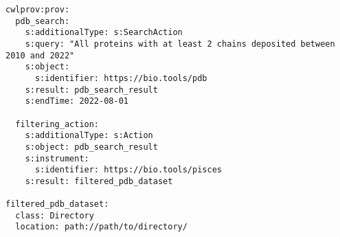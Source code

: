 \begin{verbatim}
cwlprov:prov:
  pdb_search:
    s:additionalType: s:SearchAction
    s:query: "All proteins with at least 2 chains deposited between 2010 and 2022"
    s:object:
      s:identifier: https://bio.tools/pdb
    s:result: pdb_search_result
    s:endTime: 2022-08-01
      
  filtering_action:
    s:additionalType: s:Action
    s:object: pdb_search_result
    s:instrument: 
      s:identifier: https://bio.tools/pisces
    s:result: filtered_pdb_dataset

filtered_pdb_dataset:
  class: Directory
  location: path://path/to/directory/
\end{verbatim}
